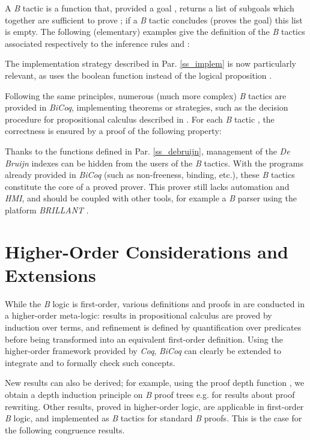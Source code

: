 \documentclass{llncs}
\begin{document}
A \emph{B} tactic is a function  that, provided a goal 
, returns a list of subgoals  which 
together are sufficient to prove ; if a \emph{B} tactic concludes (proves the 
goal) this list is empty. The following (elementary) examples give the definition of the 
\emph{B} tactics associated respectively to the inference rules  and 
:
 \begin{example}\small

\end{example}
\begin{example}\small

\end{example}
The implementation strategy described in Par. \ref{ss_implem} is now particularly relevant, as 
 uses the boolean function  instead of the logical proposition 
.

Following the same principles, numerous (much more complex) \emph{B} tactics are provided in 
\emph{BiCoq}, implementing theorems or strategies, such as the decision procedure for 
propositional calculus described in \cite{abr:1}. For each \emph{B} tactic , the 
correctness is ensured by a proof of the following property:


Thanks to the functions defined in Par. \ref{ss_debruijn}, management of the \emph{De Bruijn}
indexes can be hidden from the users of the \emph{B} tactics. With the programs already 
provided in \emph{BiCoq} (such as non-freeness, binding, etc.), these \emph{B} tactics 
constitute the core of a proved prover. This prover still lacks automation and \emph{HMI}, and 
should be coupled with other tools, for example a \emph{B} parser using the platform \emph{BRILLANT} \cite{sco:1}.

\section{Higher-Order Considerations and Extensions}\label{sc_extend}

While the \emph{B} logic is first-order, various definitions and proofs in \cite{abr:1} are 
conducted in a higher-order meta-logic: results in propositional calculus are proved by 
induction over terms, and refinement is defined by quantification over predicates before being 
transformed into an equivalent first-order definition. Using the higher-order framework
provided by \emph{Coq}, \emph{BiCoq} can clearly be extended to integrate and to formally check
such concepts.

New results can also be derived; for example, using the proof depth function
, we obtain a depth induction principle on \emph{B} 
proof trees e.g. for results about proof rewriting. Other results, proved in higher-order 
logic, are applicable in first-order \emph{B} logic, and implemented as \emph{B} tactics for 
standard \emph{B} proofs. This is the case for the following congruence results.
\end{document}
